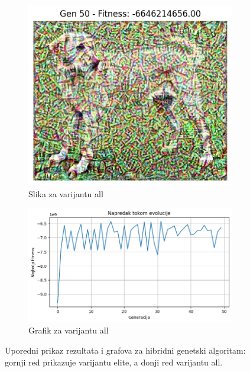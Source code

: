 \documentclass[a4paper,12pt]{article}
\begin{document}
\begin{figure}[h]
\begin{subfigure}{0.4\textwidth}
    \centering
    \includegraphics[width=\linewidth]{all2.png}
    \caption{Slika za varijantu all}
\end{subfigure}
\hfill
\begin{subfigure}{0.4\textwidth}
    \centering
    \includegraphics[width=\linewidth]{all2gr.png}
    \caption{Grafik za varijantu all}
\end{subfigure}

\caption{Uporedni prikaz rezultata i grafova za hibridni genetski algoritam: gornji red prikazuje varijantu elite, a donji red varijantu all.}
\end{figure}

\newpage
\end{document}
